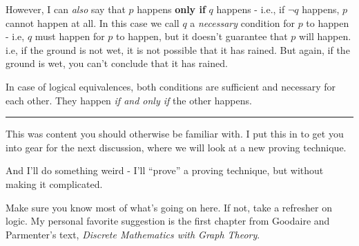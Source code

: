 However, I can \textit{also} say that $p$ happens \textbf{only if} $q$ happens - i.e., if $\neg q$ happens, $p$ cannot happen at all. In this case we call $q$ a \textit{necessary} condition for $p$ to happen - i.e, $q$ must happen for $p$ to happen, but it doesn't guarantee that $p$ will happen. i.e, if the ground is not wet, it is not possible that it has rained. But again, if the ground is wet, you can't conclude that it has rained.

In case of logical equivalences, both conditions are sufficient and necessary for each other. They happen \textit{if and only if} the other happens.\\

\hrule

This was content you should otherwise be familiar with. I put this in to get you into gear for the next discussion, where we will look at a new proving technique.

And I'll do something weird - I'll ``prove'' a proving technique, but without making it complicated.

Make sure you know most of what's going on here. If not, take a refresher on logic. My personal favorite suggestion is the first chapter from Goodaire and Parmenter's text, \textit{Discrete Mathematics with Graph Theory}.
